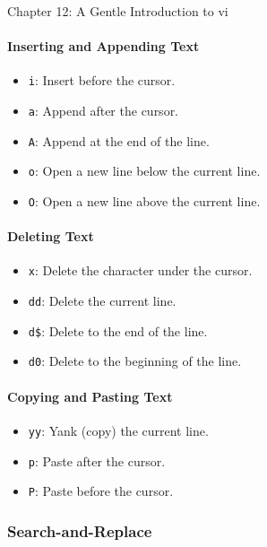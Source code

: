 \begin{notes}{Chapter 12: A Gentle Introduction to vi}
    \paragraph*{Inserting and Appending Text}

    \begin{itemize}
        \item \texttt{i}: Insert before the cursor.
        \item \texttt{a}: Append after the cursor.
        \item \texttt{A}: Append at the end of the line.
        \item \texttt{o}: Open a new line below the current line.
        \item \texttt{O}: Open a new line above the current line.
    \end{itemize}

    \paragraph*{Deleting Text}

    \begin{itemize}
        \item \texttt{x}: Delete the character under the cursor.
        \item \texttt{dd}: Delete the current line.
        \item \texttt{d\$}: Delete to the end of the line.
        \item \texttt{d0}: Delete to the beginning of the line.
    \end{itemize}

    \paragraph*{Copying and Pasting Text}

    \begin{itemize}
        \item \texttt{yy}: Yank (copy) the current line.
        \item \texttt{p}: Paste after the cursor.
        \item \texttt{P}: Paste before the cursor.
    \end{itemize}

    \subsubsection*{Search-and-Replace}


\end{notes}
